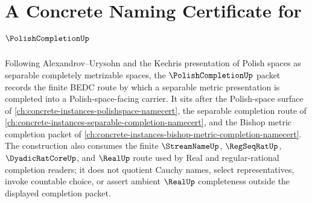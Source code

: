 \chapter{A Concrete Naming Certificate for $\PolishCompletionUp$}
\label{ch:concrete-instances-polish-completion-namecert}

Following Alexandrov--Urysohn and the Kechris presentation of Polish spaces as separable completely metrizable spaces, the $\PolishCompletionUp$ packet records the finite BEDC route by which a separable metric presentation is completed into a Polish-space-facing carrier. It sits after the Polish-space surface of \autoref{ch:concrete-instances-polishspace-namecert}, the separable completion route of \autoref{ch:concrete-instances-separable-completion-namecert}, and the Bishop metric completion packet of \autoref{ch:concrete-instances-bishop-metric-completion-namecert}. The construction also consumes the finite $\StreamNameUp$, $\RegSeqRatUp$, $\DyadicRatCoreUp$, and $\RealUp$ route used by Real and regular-rational completion readers; it does not quotient Cauchy names, select representatives, invoke countable choice, or assert ambient $\RealUp$ completeness outside the displayed completion packet.

